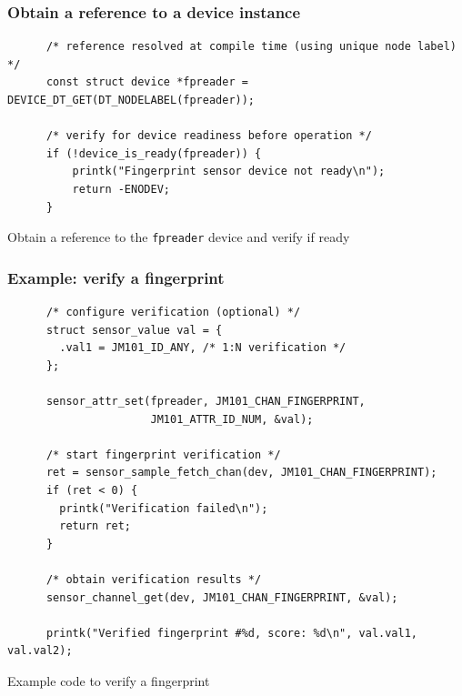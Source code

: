 \documentclass[handout]{beamer}
\begin{document}
\begin{frame}[fragile]
  \frametitle{Obtain a reference to a device instance}

  \begin{listing}[H]
    \begin{verbatim}
      /* reference resolved at compile time (using unique node label) */
      const struct device *fpreader = DEVICE_DT_GET(DT_NODELABEL(fpreader));

      /* verify for device readiness before operation */
      if (!device_is_ready(fpreader)) {
          printk("Fingerprint sensor device not ready\n");
          return -ENODEV;
      }
    \end{verbatim}
    \caption{Obtain a reference to the \texttt{fpreader} device and verify
      if ready}
  \end{listing}
\end{frame}

\begin{frame}[fragile]
  \frametitle{Example: verify a fingerprint}

  \begin{listing}[H]
    \begin{verbatim}
      /* configure verification (optional) */
      struct sensor_value val = {
        .val1 = JM101_ID_ANY, /* 1:N verification */
      };

      sensor_attr_set(fpreader, JM101_CHAN_FINGERPRINT,
                      JM101_ATTR_ID_NUM, &val);

      /* start fingerprint verification */
      ret = sensor_sample_fetch_chan(dev, JM101_CHAN_FINGERPRINT);
      if (ret < 0) {
        printk("Verification failed\n");
        return ret;
      }

      /* obtain verification results */
      sensor_channel_get(dev, JM101_CHAN_FINGERPRINT, &val);

      printk("Verified fingerprint #%d, score: %d\n", val.val1, val.val2);
    \end{verbatim}
    \caption{Example code to verify a fingerprint}
  \end{listing}
\end{frame}
\end{document}
